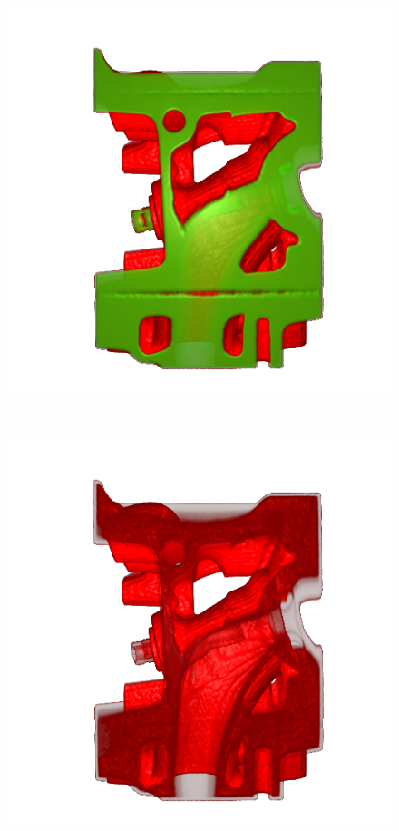 \begin{figure}
	\centering
	\begin{minipage}{.33\textwidth}
		\includegraphics[width=1\linewidth]{images/engine_naive}
		\subcaption{}
	\end{minipage}~
	\begin{minipage}{.33\textwidth}
		\includegraphics[width=1\linewidth]{images/engine_naive_1}

\end{minipage}
\end{figure}
